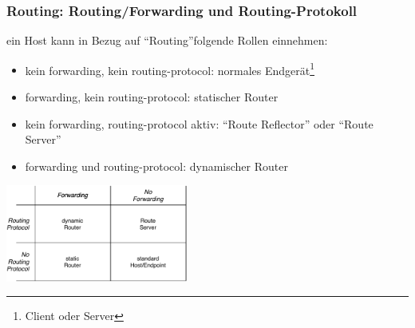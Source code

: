 \documentclass[ignorenonframetext]{beamer}
\begin{document}
\begin{frame}
\frametitle{Routing: Routing/Forwarding und Routing-Protokoll}
ein Host kann in Bezug auf ``Routing''folgende Rollen einnehmen:
\begin{itemize}
	\item{kein forwarding, kein routing-protocol: normales Endger\"at\footnote{Client oder Server}}
	\item{forwarding, kein routing-protocol: statischer Router}
	\item{kein forwarding, routing-protocol aktiv: ``Route Reflector'' oder ``Route Server''}
	\item{forwarding und routing-protocol: dynamischer Router}
\end{itemize}
\begin{center}
\includegraphics[width=6cm]{router-classification}
\end{center}
\end{frame}
\end{document}
